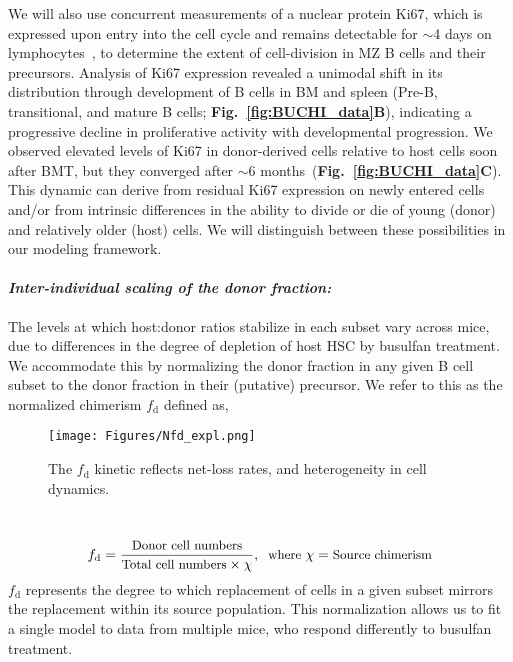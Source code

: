 \documentclass[11pt]{article}
\newcommand{\para}[1]{\vspace*{-4.5mm}\paragraph{#1}}
\begin{document}
We will also use concurrent measurements of  a nuclear protein Ki67, which is expressed upon entry into the cell cycle and remains detectable for $\sim$4 days on lymphocytes~\cite{Gossel_2017, Verheijen_2020}, to determine the extent of cell-division in MZ B cells and their precursors.
Analysis of Ki67 expression revealed a unimodal shift in its distribution through development of B cells in BM and spleen (Pre-B, transitional, and mature B cells; \textbf{Fig.~\ref{fig:BUCHI_data}B}), indicating a progressive decline in proliferative activity with developmental progression.
We observed elevated levels of Ki67 in donor-derived cells relative to host cells soon after BMT, but they converged after $\sim$6 months~(\textbf{Fig.~\ref{fig:BUCHI_data}C}).
This dynamic can derive from residual Ki67 expression on newly entered cells and/or from intrinsic differences in the ability to divide or die of young (donor) and relatively older (host) cells.
We will distinguish between these possibilities in our modeling framework.

\para{\textit{Inter-individual scaling of the donor fraction:}}
The levels at which host:donor ratios stabilize in each subset vary across mice, due to differences in the degree of depletion of host HSC by busulfan treatment. We accommodate this by normalizing the donor fraction in any given B cell subset to the donor fraction in their (putative) precursor. We refer to this as the normalized chimerism $f_\text{d}$ defined as,

\begin{wrapfigure}{r}{0.22\textwidth}
\centering
\vspace*{-9mm}
\texttt{[image: Figures/Nfd\_expl.png]}
\vspace*{-8mm}
\caption{{The $f_\text{d}$ kinetic  reflects net-loss rates, and heterogeneity in cell dynamics.}}%
\label{fig:Repop}
\vspace*{-2mm}
\end{wrapfigure}
~
\begin{equation}\small
f_\text{d} = \frac{\text{Donor cell numbers}}{\text{Total cell numbers} \times \chi}, \;\; \text{where } \chi  =\text{Source chimerism}
\label{eq:Nfd}
\end{equation}
$f_\text{d}$ represents the degree to which replacement of cells in a given subset mirrors the replacement within its source population.
This normalization allows us to fit a single model to data from multiple mice, who respond differently to busulfan treatment.
\end{document}
